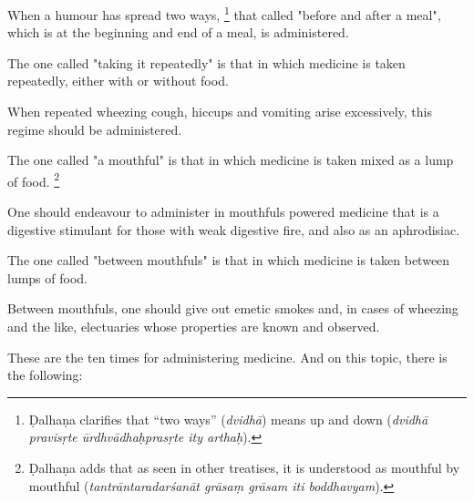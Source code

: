 \begin{translation}
\item[99]
When a humour has spread two ways,%
    \footnote{Ḍalhaṇa clarifies that ``two ways'' (\emph{dvidhā}) means up and down (\emph{dvidhā pravisṛte ūrdhvādhaḥprasṛte ity arthaḥ}).}
that called "before and after a meal", %
which is at the beginning and end of a meal, %
is administered. %

\item[100]
The one called "taking it repeatedly" is that in which medicine is taken repeatedly, either with or without food.

\item[101]
When repeated %
wheezing %
cough, hiccups and vomiting %
arise excessively,  %
this regime %
should be administered. 

\item[102]
The one called "a mouthful" is that in which medicine is taken mixed as a lump of food.%
    \footnote{Ḍalhaṇa adds that as seen in other treatises, it is understood as mouthful by mouthful (\emph{tantrāntaradarśanāt grāsaṃ grāsam iti boddhavyam}).}

\item[103]  
One should endeavour to administer in mouthfuls powered medicine that is a digestive stimulant %
for those with weak digestive fire,
and also as an aphrodisiac. 

\item[104]
The one called "between mouthfuls" is that in which medicine is taken between lumps of food.

\item[105]
Between mouthfuls, %
one should give out %
emetic smokes %
and, in cases of wheezing and the like, %
electuaries %
whose properties are known and observed. %

\item[106]
These are the ten times for administering medicine. And on this topic, there is the following:


\end{translation}
